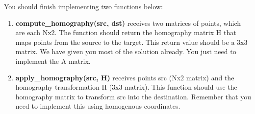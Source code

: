 \documentclass[11pt]{article}
\begin{document}
You should finish implementing two functions below:

\begin{enumerate}
\def\labelenumi{\arabic{enumi}.}
\item
  \textbf{compute\_homography(src, dst)} receives two matrices of
  points, which are each Nx2. The function should return the homography
  matrix H that maps points from the source to the target. This return
  value should be a 3x3 matrix. We have given you most of the solution
  already. You just need to implement the A matrix.
\item
  \textbf{apply\_homography(src, H)} receives points src (Nx2 matrix)
  and the homography transformation H (3x3 matrix). This function should
  use the homography matrix to transform src into the destination.
  Remember that you need to implement this using homogenous coordinates.
\end{enumerate}
\end{document}
